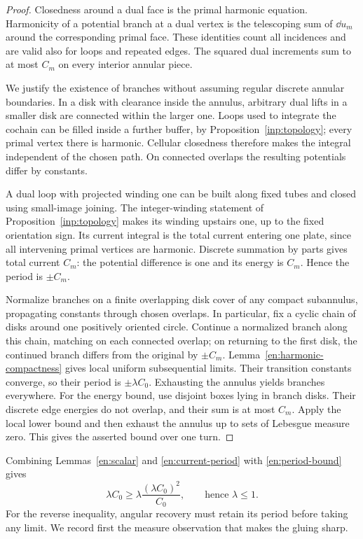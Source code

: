 \begin{proof}
Closedness around a dual face is the primal harmonic equation.
Harmonicity of a potential branch at a dual vertex is the telescoping
sum of $\dd u_m$ around the corresponding primal face.  These identities
count all incidences and are valid also for loops and repeated edges.
The squared dual increments sum to at most $C_m$ on every interior
annular piece.

We justify the existence of branches without assuming regular discrete
annular boundaries.  In a disk with clearance inside the annulus,
arbitrary dual lifts in a smaller disk are connected within the larger
one.  Loops used to integrate the cochain can be filled inside a further
buffer, by Proposition~\ref{inp:topology}; every primal vertex there is
harmonic.  Cellular closedness therefore makes the integral independent
of the chosen path.  On connected overlaps the resulting potentials
differ by constants.

A dual loop with projected winding one can be built along fixed tubes
and closed using small-image joining.  The integer-winding statement of
Proposition~\ref{inp:topology} makes its winding upstairs one, up to the
fixed orientation sign.  Its current integral is the total current
entering one plate, since all intervening primal vertices are harmonic.
Discrete summation by parts gives total current $C_m$: the potential
difference is one and its energy is $C_m$.  Hence the period is
$\pm C_m$.

Normalize branches on a finite overlapping disk cover of any compact
subannulus, propagating constants through chosen overlaps.
In particular, fix a cyclic chain of disks around one positively
oriented circle.  Continue a normalized branch along this chain,
matching on each connected overlap; on returning to the first disk,
the continued branch differs from the original by $\pm C_m$.
Lemma~\ref{en:harmonic-compactness} gives local uniform subsequential
limits.  Their transition constants converge, so their period is
$\pm\lambda C_0$.  Exhausting the annulus yields branches everywhere.
For the energy bound, use disjoint boxes lying in branch disks.  Their
discrete edge energies do not overlap, and their sum is at most $C_m$.
Apply the local lower bound and then exhaust the annulus up to sets of
Lebesgue measure zero.  This gives the asserted bound over one turn.
\end{proof}

Combining Lemmas~\ref{en:scalar} and \ref{en:current-period} with
\eqref{en:period-bound} gives
\begin{equation}\label{en:lambda-upper}
        \lambda C_0\ge
        \lambda\frac{(\lambda C_0)^2}{C_0},
        \qquad\text{hence }\lambda\le1.
\end{equation}
For the reverse inequality, angular recovery must retain its period
before taking any limit.  We record first the measure observation that
makes the gluing sharp.

